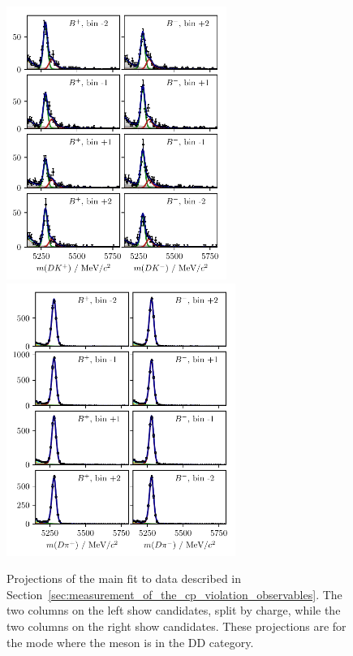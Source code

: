 \begin{figure}[tp]
    \centering
    \includegraphics[height=3.5in]{figures/analysis/bin_by_bin/pretty_fit_bins_dk_DD_1_d2kskk.pdf}
    \includegraphics[height=3.5in]{figures/analysis/bin_by_bin/pretty_fit_bins_dpi_DD_1_d2kskk.pdf}
    \caption{Projections of the main fit to data described in Section~\ref{sec:measurement_of_the_cp_violation_observables}. The two columns on the left show \BtoDK candidates, split by charge, while the two columns on the right show \BtoDpi candidates. These projections are for the \DtoKskk mode where the \KS meson is in the DD category.}
\end{figure}